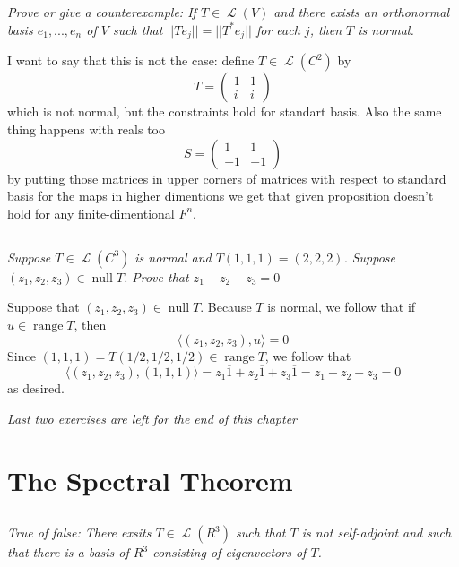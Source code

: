 \documentclass[11pt,oneside,titlepage]{book}
\DeclareMathOperator \map {\mathcal {L}}
\DeclareMathOperator \ns {null}
\DeclareMathOperator \range {range}
\newcommand{\eangle}[1]{\langle #1 \rangle}
\begin{document}
\subsection{}

\textit{Prove or give a counterexample: If $T \in \map(V)$ and there exists an orthonormal
  basis $e_1, ..., e_n$ of $V$ such that $||T e_j|| = ||T^* e_j||$ for each $j$, then $T$
  is normal.}

I want to say that this is not the case: define $T \in \map(C^2)$ by
$$T =
\begin{pmatrix}
  1 & 1 \\
  i & i
\end{pmatrix}
$$
which is not normal, but the constraints hold for standart basis. Also the same thing happens
with reals too
$$
S =
\begin{pmatrix}
  1 & 1 \\
  -1 & -1 
\end{pmatrix}
$$
by putting those matrices in upper corners of matrices with respect to standard basis
for the maps in higher dimentions we get
that given proposition doesn't hold for any finite-dimentional $F^n$.

\subsection{}

\textit{Suppose $T \in \map(C^3)$ is normal and $T(1, 1, 1) = (2, 2, 2)$. Suppose
  $(z_1, z_2, z_3) \in \ns T$. Prove that $z_1 + z_2 + z_3 = 0$}

Suppose that $(z_1, z_2, z_3) \in \ns T$. Because $T$ is normal,
we follow that if $u \in \range T$, then
$$\eangle{(z_1, z_2, z_3), u} = 0$$
Since $(1, 1, 1) = T(1/2, 1/2, 1/2) \in  \range T$, we follow that
$$\eangle{(z_1, z_2, z_3), (1, 1, 1)} = z_1 \overline{1} + z_2  \overline{1} + z_3 \overline{1} =
z_1 + z_2 + z_3 = 0$$
as desired.

\textit{Last two exercises are left for the end of this chapter}

\section{The Spectral Theorem}

\subsection{}

\textit{True of false: There exsits $T \in \map(R^3)$ such that $T$ is not self-adjoint and
  such that there is a basis of $R^3$ consisting of eigenvectors of $T$.}
\end{document}
